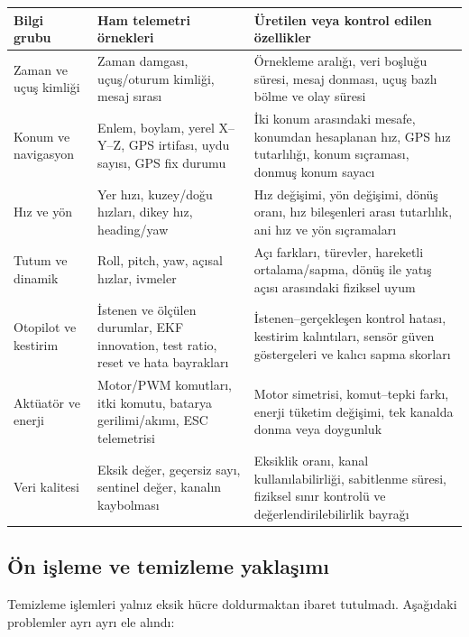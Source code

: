 \documentclass[11pt,a4paper]{article}
\begin{document}
\begin{longtable}{p{}p{}p{}}
\toprule
\textbf{Bilgi grubu} & \textbf{Ham telemetri örnekleri} & \textbf{Üretilen veya kontrol edilen özellikler} \\
\midrule
\endhead
Zaman ve uçuş kimliği &
Zaman damgası, uçuş/oturum kimliği, mesaj sırası &
Örnekleme aralığı, veri boşluğu süresi, mesaj donması, uçuş bazlı bölme ve olay süresi \\

Konum ve navigasyon &
Enlem, boylam, yerel X--Y--Z, GPS irtifası, uydu sayısı, GPS fix durumu &
İki konum arasındaki mesafe, konumdan hesaplanan hız, GPS hız tutarlılığı,
konum sıçraması, donmuş konum sayacı \\

Hız ve yön &
Yer hızı, kuzey/doğu hızları, dikey hız, heading/yaw &
Hız değişimi, yön değişimi, dönüş oranı, hız bileşenleri arası tutarlılık,
ani hız ve yön sıçramaları \\

Tutum ve dinamik &
Roll, pitch, yaw, açısal hızlar, ivmeler &
Açı farkları, türevler, hareketli ortalama/sapma, dönüş ile yatış açısı
arasındaki fiziksel uyum \\

Otopilot ve kestirim &
İstenen ve ölçülen durumlar, EKF innovation, test ratio, reset ve hata bayrakları &
İstenen--gerçekleşen kontrol hatası, kestirim kalıntıları, sensör güven
göstergeleri ve kalıcı sapma skorları \\

Aktüatör ve enerji &
Motor/PWM komutları, itki komutu, batarya gerilimi/akımı, ESC telemetrisi &
Motor simetrisi, komut--tepki farkı, enerji tüketim değişimi, tek kanalda
donma veya doygunluk \\

Veri kalitesi &
Eksik değer, geçersiz sayı, sentinel değer, kanalın kaybolması &
Eksiklik oranı, kanal kullanılabilirliği, sabitlenme süresi, fiziksel sınır
kontrolü ve değerlendirilebilirlik bayrağı \\
\bottomrule
\end{longtable}

\subsection{Ön işleme ve temizleme yaklaşımı}

Temizleme işlemleri yalnız eksik hücre doldurmaktan ibaret tutulmadı. Aşağıdaki
problemler ayrı ayrı ele alındı:
\end{document}
